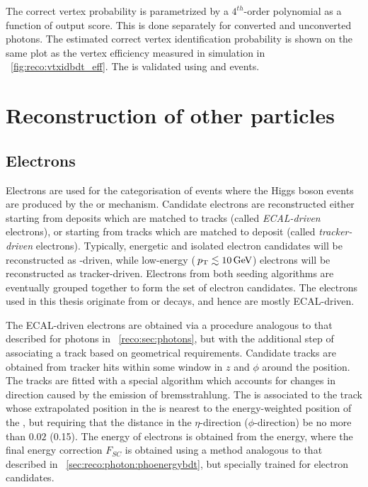 The correct vertex probability is parametrized by a $4^{th}$-order polynomial as a function of \VtxIdBdt output score. This is done separately for converted and unconverted photons. The estimated correct vertex identification probability is shown on the same plot as the vertex efficiency measured in simulation in \Fig~\ref{fig:reco:vtxidbdt_eff}. The \VtxProbBdt is validated using \Zmumu and \gammaJet events. 

\section{Reconstruction of other particles} 
\label{reco:sec:other}
\subsection{Electrons}

Electrons are used for the categorisation of \Hgg events where the Higgs boson events are produced by the \ZH or \WH mechanism. Candidate \PF electrons are reconstructed either starting from \ECAL deposits which are matched to tracks (called \emph{ECAL-driven} electrons), or starting from tracks which are matched to \ECAL deposit (called \emph{tracker-driven} electrons). Typically, energetic and isolated electron candidates will be reconstructed as \ECAL-driven, while low-energy ($\,p_\text{T} \lesssim 10\,\text{Ge\hspace{-.08em}V}$) electrons will be reconstructed as tracker-driven. Electrons from both seeding algorithms are eventually grouped together to form the set of \PF electron candidates. The electrons used in this thesis originate from \PWpm or \PZ decays, and hence are mostly ECAL-driven.

The ECAL-driven electrons are obtained via a procedure analogous to that described for photons in \Sec~\ref{reco:sec:photons}, but with the additional step of associating a track based on geometrical requirements. Candidate tracks are obtained from tracker hits within some window in $z$ and $\phi$ around the \SC position. The tracks are fitted with a special algorithm which accounts for changes in direction caused by the emission of bremsstrahlung. The \SC is associated to the track whose extrapolated position in the \ECAL is nearest to the energy-weighted position of the \SC, but requiring that the distance in the $\eta$-direction ($\phi$-direction) be no more than $0.02$ (0.15). The energy of electrons is obtained from the \SC energy, where the final energy correction $F_{SC}$ is obtained using a \BDT method analogous to that described in \Sec~\ref{sec:reco:photon:phoenergybdt}, but specially trained for electron candidates.


